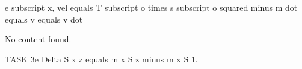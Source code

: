 e subscript x, vel equals T subscript o times s subscript o squared minus m dot equals v equals v dot

No content found.

TASK 3e
Delta S x z equals m x S z minus m x S 1.